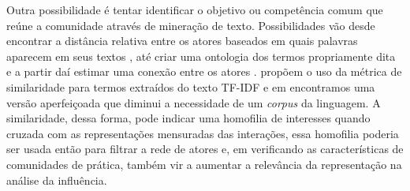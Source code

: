 Outra possibilidade é tentar identificar o objetivo ou competência comum que
reúne a comunidade através de mineração de texto. Possibilidades vão desde
encontrar a distância relativa entre os atores baseados em quais palavras
aparecem em seus textos \citep{Reichling2005}, até criar uma ontologia dos termos
propriamente dita e a partir daí estimar uma conexão entre os atores
\citep{Mori2006}. \citet{Spertus2005} propõem o uso da métrica de similaridade
para termos extraídos do texto TF-IDF \citep{Salton1989, Frakes1992} e em
\citet{MATSUO2007} encontramos uma versão aperfeiçoada que diminui a necessidade
de um \emph{corpus} da linguagem. A similaridade, dessa forma, pode indicar uma
homofilia de interesses quando cruzada com as representações mensuradas das
interações, essa homofilia poderia ser usada então para filtrar a rede de atores
e, em verificando as características de comunidades de prática, também vir a
aumentar a relevância da representação na análise da influência.
